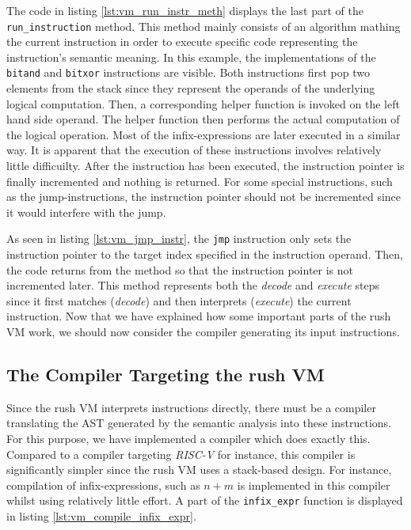 The code in listing \ref{lst:vm_run_instr_meth} displays the last part of the \texttt{run\_instruction} method.
This method mainly consists of an algorithm mathing the current instruction in order to execute specific code representing the instruction's semantic meaning.
In this example, the implementations of the \texttt{bitand} and \texttt{bitxor} instructions are visible.
Both instructions first pop two elements from the stack since they represent the operands of the underlying logical computation.
Then, a corresponding helper function is invoked on the left hand side operand.
The helper function then performs the actual computation of the logical operation.
Most of the infix-expressions are later executed in a similar way.
It is apparent that the execution of these instructions involves relatively little difficuilty.
After the instruction has been executed, the instruction pointer is finally incremented and nothing is returned.
For some special instructions, such as the jump-instructions, the instruction pointer should not be incremented since it would interfere with the jump.


As seen in listing \ref{lst:vm_jmp_instr}, the \texttt{jmp} instruction only sets the instruction pointer to the target index specified in the instruction operand.
Then, the code returns from the method so that the instruction pointer is not incremented later.
This method represents both the \emph{decode} and \emph{execute} steps since it first matches (\emph{decode}) and then interprets (\emph{execute}) the current instruction.
Now that we have explained how some important parts of the rush VM work, we should now consider the compiler generating its input instructions.


\subsection{The Compiler Targeting the rush VM}

Since the rush VM interprets instructions directly, there must be a compiler translating the AST generated by the semantic analysis into these instructions.
For this purpose, we have implemented a compiler which does exactly this.
Compared to a compiler targeting \emph{RISC-V} for instance, this compiler is significantly simpler since the rush VM uses a stack-based design.
For instance, compilation of infix-expressions, such as $n + m$ is implemented in this compiler whilst using relatively little effort.
A part of the \texttt{infix\_expr} function is displayed in listing \ref{lst:vm_compile_infix_expr}.

